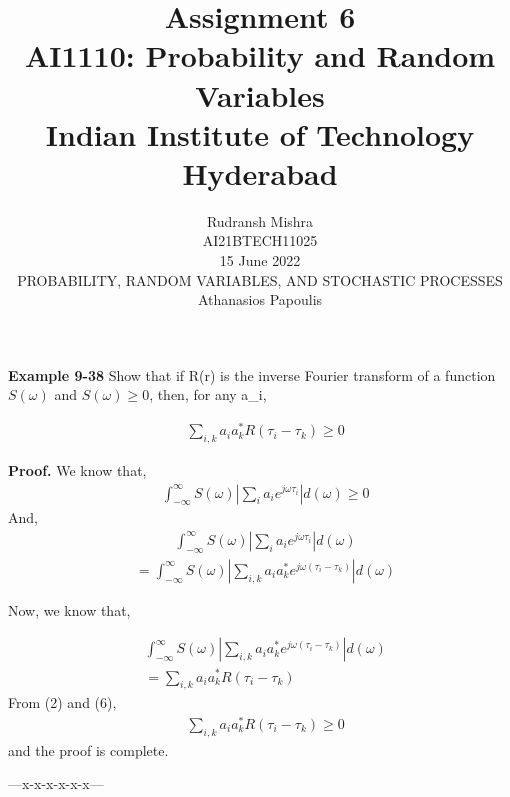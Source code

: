 \documentclass[journal,12pt,twocolumn]{IEEEtran}
\title{Assignment 6 \\ \Large AI1110: Probability and Random Variables \\ \large Indian Institute of Technology Hyderabad}
\author{Rudransh Mishra \\ \normalsize AI21BTECH11025 \\ \vspace*{20pt} \normalsize  15 June 2022 \\ \vspace*{20pt} PROBABILITY, RANDOM VARIABLES, AND STOCHASTIC PROCESSES\\ \normalsize Athanasios Papoulis}
\begin{document}
\maketitle

\textbf{Example 9-38}
Show that if R(r) is the inverse Fourier transform of a function $S(\omega)$ and $S(\omega) \geq 0$, then, for any a_i,
\par 
\begin{align}
  &\sum_{i,k}^{} a_i a_k^{*} R(\tau_i - \tau_k) \geq 0
\end{align}

\textbf{Proof.}
We know that,
\begin {align}
&\int_{-\infty}^{\infty}S(\omega) |\sum_{i}^{} a_i e^{j \omega \tau_i}|d(\omega)\geq 0
\end {align}
And,
\begin {align}
&\int_{-\infty}^{\infty}S(\omega) | \sum_{i}^{} a_i e^{j \omega \tau_i}|d(\omega) 
\end {align}
\begin {align}
&= \int_{-\infty}^{\infty}S(\omega) | \sum_{i,k}^{} a_i a_k^{*} e^{j \omega (\tau_i-\tau_k)}| d(\omega)
\end {align}

Now, we know that,

\begin {align}
&\int_{-\infty}^{\infty}S(\omega) | \sum_{i,k}^{} a_i a_k^{*} e^{j \omega (\tau_i-\tau_k)}| d(\omega)\\
&=\sum_{i,k}^{} a_i a_k^{*} R(\tau_i - \tau_k)
\end {align}
From (2) and (6),
\begin {align}
&\sum_{i,k}^{} a_i a_k^{*} R(\tau_i - \tau_k) \geq 0
\end {align}
and the proof is complete.

\begin{center} ---x-x-x-x-x-x--- \end{center}
\end{document}
